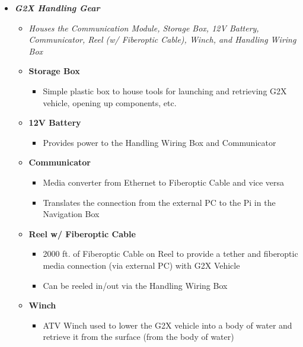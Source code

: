 \documentclass[12pt]{article}
\begin{document}
{\begin{itemize}
\begin{itemize}
					\item[] \textbf{Buoyancy Foam}
					\begin{itemize}
						\item Machinable, hydrostatic pressure-resistant foams that provide buoyancy underwater\\\\
					\end{itemize}
				\end{itemize}
				\item \textbf{\textit{G2X Handling Gear}}
				\begin{itemize}	
					\item[] \textit{Houses the Communication Module, Storage Box, 12V Battery, Communicator, Reel (w/ Fiberoptic Cable), Winch, and Handling Wiring Box\\}
					\item[] \textbf{Storage Box}
					\begin{itemize}
						\item Simple plastic box to house tools for launching and retrieving G2X vehicle, opening up components, etc.
					\end{itemize}
					\item[] \textbf{12V Battery}
					\begin{itemize}
						\item Provides power to the Handling Wiring Box and Communicator
					\end{itemize}
					\item[] \textbf{Communicator}
					\begin{itemize}
						\item Media converter from Ethernet to Fiberoptic Cable and vice versa
						\item Translates the connection from the external PC to the Pi in the Navigation Box
					\end{itemize}
					\item[] \textbf{Reel w/ Fiberoptic Cable}
					\begin{itemize}
						\item 2000 ft. of Fiberoptic Cable on Reel to provide a tether and fiberoptic media connection (via external PC) with G2X Vehicle
						\item Can be reeled in/out via the Handling Wiring Box
					\end{itemize}
					\item[] \textbf{Winch}
					\begin{itemize}
						\item ATV Winch used to lower the G2X vehicle into a body of water and retrieve it from the surface (from the body of water)

\end{itemize}
\end{itemize}
\end{itemize}}
\end{document}
